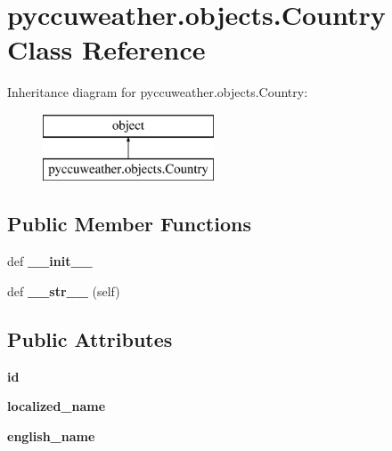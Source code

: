 \hypertarget{classpyccuweather_1_1objects_1_1_country}{}\section{pyccuweather.\+objects.\+Country Class Reference}
\label{classpyccuweather_1_1objects_1_1_country}
Inheritance diagram for pyccuweather.\+objects.\+Country\+:\begin{figure}[H]
\begin{center}
\leavevmode
\includegraphics[height=2.000000cm]{classpyccuweather_1_1objects_1_1_country}
\end{center}
\end{figure}
\subsection*{Public Member Functions}
\begin{DoxyCompactItemize}
\item 
\hypertarget{classpyccuweather_1_1objects_1_1_country_a75be1bd9a2158a7fef301682d3c48454}{}def {\bfseries \+\_\+\+\_\+init\+\_\+\+\_\+}\label{classpyccuweather_1_1objects_1_1_country_a75be1bd9a2158a7fef301682d3c48454}

\item 
\hypertarget{classpyccuweather_1_1objects_1_1_country_ae2a347065c1d9072738e6a3d8042d5df}{}def {\bfseries \+\_\+\+\_\+str\+\_\+\+\_\+} (self)\label{classpyccuweather_1_1objects_1_1_country_ae2a347065c1d9072738e6a3d8042d5df}

\end{DoxyCompactItemize}
\subsection*{Public Attributes}
\begin{DoxyCompactItemize}
\item 
\hypertarget{classpyccuweather_1_1objects_1_1_country_a03f645bbf25c4cee40ebce2fdfc97215}{}{\bfseries id}\label{classpyccuweather_1_1objects_1_1_country_a03f645bbf25c4cee40ebce2fdfc97215}

\item 
\hypertarget{classpyccuweather_1_1objects_1_1_country_a7c6f624291a161173b4f306add66bd7d}{}{\bfseries localized\+\_\+name}\label{classpyccuweather_1_1objects_1_1_country_a7c6f624291a161173b4f306add66bd7d}

\item 
\hypertarget{classpyccuweather_1_1objects_1_1_country_a24f12c79057c8575fcfe52300f77de0f}{}{\bfseries english\+\_\+name}\label{classpyccuweather_1_1objects_1_1_country_a24f12c79057c8575fcfe52300f77de0f}

\end{DoxyCompactItemize}


